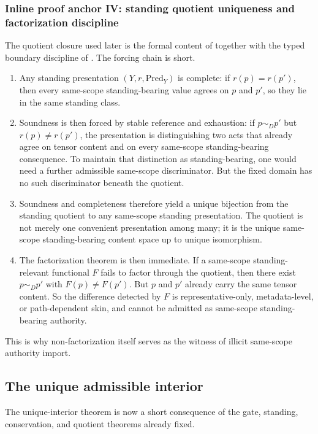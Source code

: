 \subsubsection*{Inline proof anchor IV: standing quotient uniqueness and factorization discipline}

The quotient closure used later is the formal content of \atsdoc{} together with the typed boundary discipline of \exhaustiondoc{}. The forcing chain is short.
\begin{enumerate}
  \item Any standing presentation $(Y,r,\mathrm{Pred}_Y)$ is complete: if $r(p)=r(p')$, then every same-scope standing-bearing value agrees on $p$ and $p'$, so they lie in the same standing class.
  \item Soundness is then forced by stable reference and exhaustion: if $p\sim_D p'$ but $r(p)\neq r(p')$, the presentation is distinguishing two acts that already agree on tensor content and on every same-scope standing-bearing consequence. To maintain that distinction as standing-bearing, one would need a further admissible same-scope discriminator. But the fixed domain has no such discriminator beneath the quotient.
  \item Soundness and completeness therefore yield a unique bijection from the standing quotient to any same-scope standing presentation. The quotient is not merely one convenient presentation among many; it is the unique same-scope standing-bearing content space up to unique isomorphism.
  \item The factorization theorem is then immediate. If a same-scope standing-relevant functional $F$ fails to factor through the quotient, then there exist $p\sim_D p'$ with $F(p)\neq F(p')$. But $p$ and $p'$ already carry the same tensor content. So the difference detected by $F$ is representative-only, metadata-level, or path-dependent skin, and cannot be admitted as same-scope standing-bearing authority.
\end{enumerate}
This is why non-factorization itself serves as the witness of illicit same-scope authority import.

\subsection{The unique admissible interior}

The unique-interior theorem is now a short consequence of the gate, standing, conservation, and quotient theorems already fixed.

